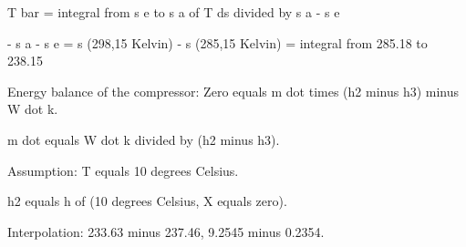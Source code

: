 T bar = integral from s e to s a of T ds divided by s a - s e

- s a - s e = s (298,15 Kelvin) - s (285,15 Kelvin) = integral from 285.18 to 238.15

Energy balance of the compressor:
Zero equals m dot times (h2 minus h3) minus W dot k.

m dot equals W dot k divided by (h2 minus h3).

Assumption: T equals 10 degrees Celsius.

h2 equals h of (10 degrees Celsius, X equals zero).

Interpolation:
233.63 minus 237.46,
9.2545 minus 0.2354.
